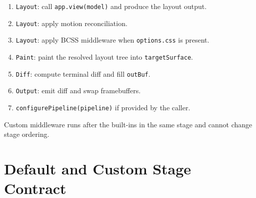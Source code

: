 \begin{enumerate}
\def\labelenumi{\arabic{enumi}.}
\tightlist
\item
  \texttt{L\allowbreak{}a\allowbreak{}y\allowbreak{}o\allowbreak{}u\allowbreak{}t}: call \texttt{a\allowbreak{}p\allowbreak{}p\allowbreak{}.\allowbreak{}v\allowbreak{}i\allowbreak{}e\allowbreak{}w\allowbreak{}(\allowbreak{}m\allowbreak{}o\allowbreak{}d\allowbreak{}e\allowbreak{}l\allowbreak{})} and produce the layout output.
\item
  \texttt{L\allowbreak{}a\allowbreak{}y\allowbreak{}o\allowbreak{}u\allowbreak{}t}: apply motion reconciliation.
\item
  \texttt{L\allowbreak{}a\allowbreak{}y\allowbreak{}o\allowbreak{}u\allowbreak{}t}: apply BCSS middleware when \texttt{o\allowbreak{}p\allowbreak{}t\allowbreak{}i\allowbreak{}o\allowbreak{}n\allowbreak{}s\allowbreak{}.\allowbreak{}c\allowbreak{}s\allowbreak{}s} is present.
\item
  \texttt{P\allowbreak{}a\allowbreak{}i\allowbreak{}n\allowbreak{}t}: paint the resolved layout tree into \texttt{t\allowbreak{}a\allowbreak{}r\allowbreak{}g\allowbreak{}e\allowbreak{}t\allowbreak{}S\allowbreak{}u\allowbreak{}r\allowbreak{}f\allowbreak{}a\allowbreak{}c\allowbreak{}e}.
\item
  \texttt{D\allowbreak{}i\allowbreak{}f\allowbreak{}f}: compute terminal diff and fill \texttt{o\allowbreak{}u\allowbreak{}t\allowbreak{}B\allowbreak{}u\allowbreak{}f}.
\item
  \texttt{O\allowbreak{}u\allowbreak{}t\allowbreak{}p\allowbreak{}u\allowbreak{}t}: emit diff and swap framebuffers.
\item
  \texttt{c\allowbreak{}o\allowbreak{}n\allowbreak{}f\allowbreak{}i\allowbreak{}g\allowbreak{}u\allowbreak{}r\allowbreak{}e\allowbreak{}P\allowbreak{}i\allowbreak{}p\allowbreak{}e\allowbreak{}l\allowbreak{}i\allowbreak{}n\allowbreak{}e\allowbreak{}(\allowbreak{}p\allowbreak{}i\allowbreak{}p\allowbreak{}e\allowbreak{}l\allowbreak{}i\allowbreak{}n\allowbreak{}e\allowbreak{})} if provided by the caller.
\end{enumerate}

Custom middleware runs after the built-ins in the same stage and cannot change stage ordering.

\section{Default and Custom Stage Contract}\label{record-014-default-and-custom-stage-contract}

